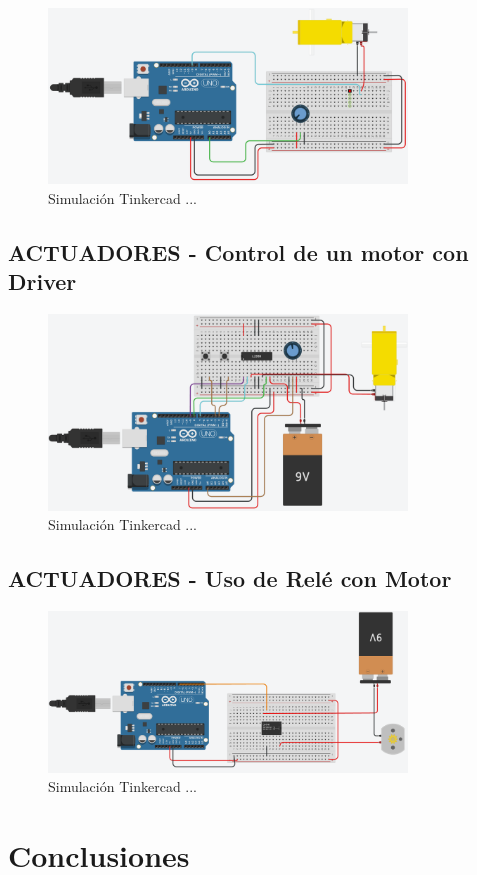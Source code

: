 \documentclass{article}
\begin{document}
\begin{figure}[H]
    \centering
    \includegraphics[width=0.85\textwidth]{./img/ckpt_encendido_motor.png}
    \caption{Simulación Tinkercad ...}
    \label{fig:encendido_motor}
\end{figure}


\subsection{ACTUADORES - Control de un motor con Driver}


\begin{figure}[H]
    \centering
    \includegraphics[width=0.85\textwidth]{./img/ckpt_motor_driver.png}
    \caption{Simulación Tinkercad ...}
    \label{fig:motor_driver}
\end{figure}


\subsection{ACTUADORES - Uso de Relé con Motor}

\begin{figure}[H]
    \centering
    \includegraphics[width=0.85\textwidth]{./img/ckpt_rele_motor.png}
    \caption{Simulación Tinkercad ...}
    \label{fig:motor_driver}
\end{figure}



\section{Conclusiones}
\end{document}
